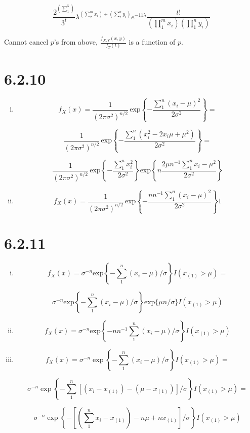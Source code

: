 \documentclass{article}
\begin{document}
\[
\frac{2^{(\sum_1^5)}}{3^t} \lambda^{(\sum_2^m x_i) + (\sum_2^n y_i)}
e^{-11\lambda} \frac{t!}{(\prod_1^m x_i)(\prod_1^n y_i)}
\]

Cannot cancel $p$'s from above, $\frac{f_{X,Y}(x,y)}{f_T(t)}$ is a function of
$p$.

\section{6.2.10}
\begin{enumerate}[(i)]
\item
\[
f_X(x) = \frac{1}{(2\pi\sigma^2)^{n/2}} \hspace{2pt}
\text{exp} \left\{ -\frac{\sum_1^n(x_i-\mu)^2}{2\sigma^2} \right\} =
\]

\[
\frac{1}{(2\pi\sigma^2)^{n/2}} \hspace{2pt}
\text{exp} \left\{ -\frac{\sum_1^n(x_i^2-2x_i\mu+\mu^2)}{2\sigma^2} \right\} =
\]
 
\[
\frac{1}{(2\pi\sigma^2)^{n/2}} \hspace{2pt}
\text{exp} \left\{ -\frac{\sum_1^n x_i^2}{2\sigma^2} \right\}
\text{exp} \left\{ n\frac{2\mu n^{-1}\sum_1^n x_i -\mu^2}{2\sigma^2} \right\}
\]

\hspace{3em}

\item
\[
f_X(x) = \frac{1}{(2\pi\sigma^2)^{n/2}} \hspace{2pt}
\text{exp} \left\{ -\frac{nn^{-1}\sum_1^n(x_i-\mu)^2}{2\sigma^2} \right\}1
\]

\end{enumerate}

\section{6.2.11}
\begin{enumerate}[(i)]
\item
\[
f_X(x) = \sigma^{-n} \text{exp} \left\{ -\sum_1^n (x_i-\mu)/\sigma \right\}
I(x_{(1)}>\mu) = 
\]

\[
\sigma^{-n} \text{exp} \left\{ -\sum_1^n (x_i-\mu)/\sigma \right\}
\text{exp} \{ \mu n/\sigma \} I(x_{(1)}>\mu)
\]

\hspace{3em}

\item
\[
f_X(x) = \sigma^{-n} \text{exp} \left\{ -nn^{-1}\sum_1^n (x_i-\mu)/\sigma \right\}
I(x_{(1)}>\mu)
\]

\hspace{3em}

\item
\[
f_X(x) = \sigma^{-n} \exp \left\{ -\sum_1^n (x_i-\mu)/\sigma \right\}
I(x_{(1)}>\mu) =
\]

\[
\sigma^{-n} \exp \left\{ -\sum_1^n [(x_i-x_{(1)}) - (\mu - x_{(1)})]/\sigma \right\} I(x_{(1)}>\mu) =
\]

\[
\sigma^{-n} \exp \left\{ - \left[ \left(\sum_1^n x_i - x_{(1)} \right) - n\mu + nx_{(1)} \right] /\sigma \right\} I(x_{(1)}>\mu)
\]

\end{enumerate}
\end{document}
